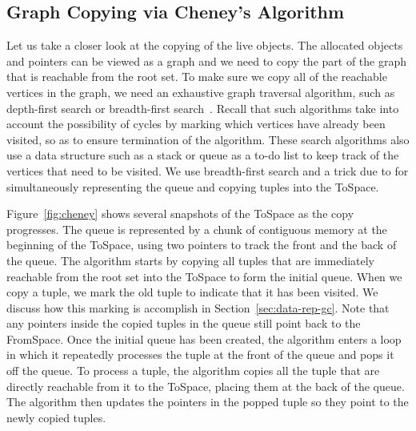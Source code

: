 \documentclass[11pt]{book}
\begin{document}
{\subsection{Graph Copying via Cheney's Algorithm}
\label{sec:cheney}
Let us take a closer look at the copying of the live objects. The
allocated objects and pointers can be viewed as a graph and we need to
copy the part of the graph that is reachable from the root set. To
make sure we copy all of the reachable vertices in the graph, we need
an exhaustive graph traversal algorithm, such as depth-first search or
breadth-first search~\citep{Moore:1959aa,Cormen:2001uq}. Recall that
such algorithms take into account the possibility of cycles by marking
which vertices have already been visited, so as to ensure termination
of the algorithm. These search algorithms also use a data structure
such as a stack or queue as a to-do list to keep track of the vertices
that need to be visited. We use breadth-first search and a trick
due to \citet{Cheney:1970aa} for simultaneously representing the queue
and copying tuples into the ToSpace.

Figure~\ref{fig:cheney} shows several snapshots of the ToSpace as the
copy progresses. The queue is represented by a chunk of contiguous
memory at the beginning of the ToSpace, using two pointers to track
the front and the back of the queue. The algorithm starts by copying
all tuples that are immediately reachable from the root set into the
ToSpace to form the initial queue.  When we copy a tuple, we mark the
old tuple to indicate that it has been visited. We discuss how this
marking is accomplish in Section~\ref{sec:data-rep-gc}. Note that any
pointers inside the copied tuples in the queue still point back to the
FromSpace. Once the initial queue has been created, the algorithm
enters a loop in which it repeatedly processes the tuple at the front
of the queue and pops it off the queue.  To process a tuple, the
algorithm copies all the tuple that are directly reachable from it to
the ToSpace, placing them at the back of the queue. The algorithm then
updates the pointers in the popped tuple so they point to the newly
copied tuples.

}
\end{document}
